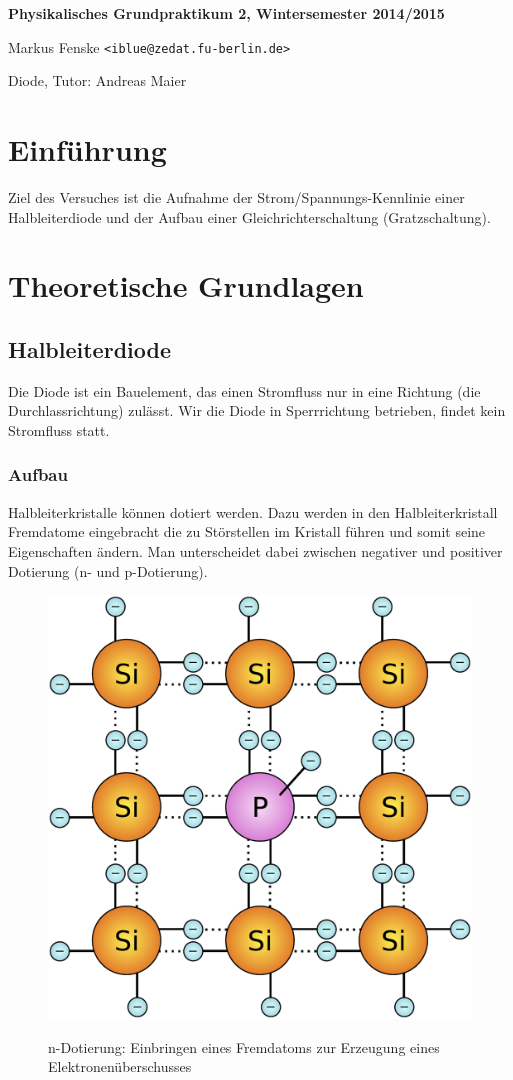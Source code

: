 \documentclass[a4paper,german,12pt,smallheadings]{scrartcl}
\begin{document}
\allowdisplaybreaks %
\begin{center}
\bfseries %
\sffamily %
\vspace{-40pt}
Physikalisches Grundpraktikum 2, Wintersemester 2014/2015

Markus Fenske \texttt{<iblue@zedat.fu-berlin.de>}

Diode, Tutor: Andreas Maier
\vspace{-10pt}
\end{center}
\section{Einführung}
Ziel des Versuches ist die Aufnahme der Strom/Spannungs-Kennlinie einer
Halbleiterdiode und der Aufbau einer Gleichrichterschaltung (Gratzschaltung).

\section{Theoretische Grundlagen}

\subsection{Halbleiterdiode}

Die Diode ist ein Bauelement, das einen Stromfluss nur in eine Richtung (die
Durchlassrichtung) zulässt. Wir die Diode in Sperrrichtung betrieben, findet
kein Stromfluss statt.

\subsubsection{Aufbau}

Halbleiterkristalle können dotiert werden. Dazu werden in den
Halbleiterkristall Fremdatome eingebracht die zu Störstellen im Kristall führen
und somit seine Eigenschaften ändern. Man unterscheidet dabei zwischen
negativer und positiver Dotierung (n- und p-Dotierung).

\begin{figure}[H]
  \centering
  \includegraphics[width=.3\textwidth]{ndot.pdf}
  \label{img:ndot}
  \caption{n-Dotierung: Einbringen eines Fremdatoms zur Erzeugung eines Elektronenüberschusses}
\end{figure}
\end{document}
